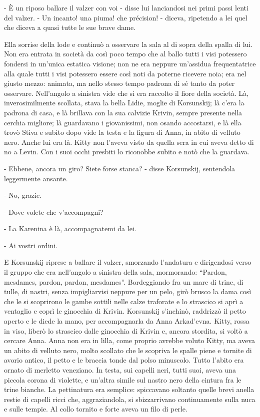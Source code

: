 - È un riposo ballare il valzer con voi - disse lui lanciandosi nei primi passi lenti del valzer. - Un incanto! una piuma! che précision! - diceva, ripetendo a lei quel che diceva a quasi tutte le sue brave dame. 

Ella sorrise della lode e continuò a osservare la sala al di sopra della spalla di lui. Non era entrata in società da così poco tempo che al ballo tutti i visi potessero fondersi in un'unica estatica visione; non ne era neppure un'assidua frequentatrice alla quale tutti i visi potessero essere così noti da poterne ricevere noia; era nel giusto mezzo: animata, ma nello stesso tempo padrona di sé tanto da poter osservare. Nell'angolo a sinistra vide che si era raccolto il fiore della società. Là, inverosimilmente scollata, stava la bella Lidie, moglie di Korsunskij; là c'era la padrona di casa, e là brillava con la sua calvizie Krivin, sempre presente nella cerchia migliore; là guardavano i giovanissimi, non osando accostarsi, e là ella trovò Stiva e subito dopo vide la testa e la figura di Anna, in abito di velluto nero. Anche lui era là. Kitty non l'aveva visto da quella sera in cui aveva detto di no a Levin. Con i suoi occhi presbiti lo riconobbe subito e notò che la guardava. 

- Ebbene, ancora un giro? Siete forse stanca? - disse Korsunskij, sentendola leggermente ansante. 

- No, grazie. 

- Dove volete che v'accompagni? 

- La Karenina è là, accompagnatemi da lei. 

- Ai vostri ordini. 

E Korsunskij riprese a ballare il valzer, smorzando l'andatura e dirigendosi verso il gruppo che era nell'angolo a sinistra della sala, mormorando: ``Pardon, mesdames, pardon, pardon, mesdames''. Bordeggiando fra un mare di trine, di tulle, di nastri, senza impigliarvisi neppure per un pelo, girò brusco la dama così che le si scoprirono le gambe sottili nelle calze traforate e lo strascico si aprì a ventaglio e coprì le ginocchia di Krivin. Korsunskij s'inchinò, raddrizzò il petto aperto e le diede la mano, per accompagnarla da Anna Arkad'evna. Kitty, rossa in viso, liberò lo strascico dalle ginocchia di Krivin e, ancora stordita, si voltò a cercare Anna. Anna non era in lilla, come proprio avrebbe voluto Kitty, ma aveva un abito di velluto nero, molto scollato che le scopriva le spalle piene e tornite di avorio antico, il petto e le braccia tonde dal polso minuscolo. Tutto l'abito era ornato di merletto veneziano. In testa, sui capelli neri, tutti suoi, aveva una piccola corona di violette, e un'altra simile sul nastro nero della cintura fra le trine bianche. La pettinatura era semplice: spiccavano soltanto quelle brevi anella restie di capelli ricci che, aggraziandola, si sbizzarrivano continuamente sulla nuca e sulle tempie. Al collo tornito e forte aveva un filo di perle. 


